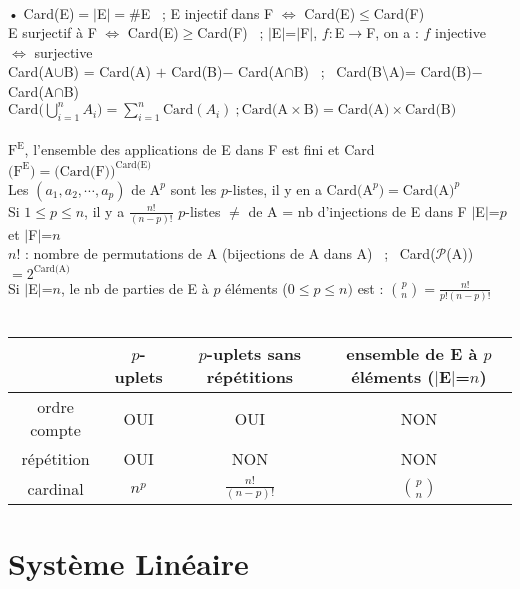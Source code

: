 \documentclass[12 pt]{exampleclass}
\begin{document}
\begin{flushleft}
\begin{doublespace}
	\text{}\\
	• Card(E)$=|$E$|=\#$E \ ; E injectif dans F $\Leftrightarrow$ Card(E)$\leq$Card(F)\\
	 E surjectif à F $\Leftrightarrow$ Card(E)$\geq$Card(F) \ ; $|$E$|$=$|$F$|$, $f:$E$\rightarrow$F, on a : $f$ injective $\Leftrightarrow$ surjective\\
	 Card(A$\cup$B) = Card(A) $+$ Card(B)$-$ Card(A$\cap$B) \ ; \ Card(B\textbackslash A)= Card(B)$-$ Card(A$\cap$B)\\ 
	 $\text{Card}\Big(\bigcup_{i=1}^n A_i \Big)= \sum\limits_{i=1}^n \text{Card}(A_i) \ ;  \text{Card(A}\times \text{B}) = \text{Card(A)}\times \text{Card(B)}$\\
	 \text{}\\
	 $\text{F}^\text{E}$, l'ensemble des applications de E dans F est fini et Card$\big(\text{F}^\text{E}\big) = \big( \text{Card(F)} \big)^\text{Card(E)}$\\
	 Les $(a_1,a_2,\cdots ,a_p)$ de $\text{A}^p$ sont les $p$-listes, il y en a Card$\big(\text{A}^p\big) = \text{Card(A)}^p$\\
	 Si $1\leq p \leq n$, il y a $\frac{n!}{(n-p)!}$ $p$-listes $\ne$ de A = nb d'injections de E dans F $|$E$|$=$p$ et $|$F$|$=$n$\\
	$n!$ : nombre de permutations de A (bijections de A dans A)  \ ; \ Card($\mathcal{P}$(A))$= 2^{\text{Card(A)}}$\\
	Si $|$E$|$=$n$, le nb de parties de E à $p$ éléments ($0\leq p \leq n)$ est : $\binom{p}{n} = \frac{n!}{p! (n-p)!}$\\
	\text{}\\
	\begin{tabular}{|c|c|c|c|}
		\cline{2-4}
		 \multicolumn{1}{c|}{} & $p$-uplets & $p$-uplets sans répétitions & ensemble de E à $p$ éléments ($|$E$|$=$n$)  \\
		\hline
		ordre compte & OUI & OUI & NON \\ 
		\hline
		répétition & OUI & NON & NON \\
		\hline
		cardinal & $n^p$ & $\frac{n!}{(n-p)!}$ & $\binom{p}{n}$\\
		\hline
	\end{tabular}

\end{doublespace}
\end{flushleft}

\section{Système Linéaire}
\end{document}
